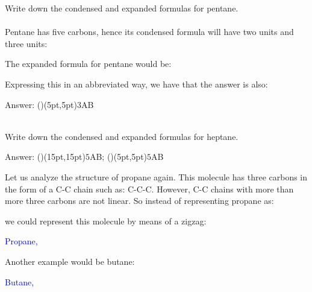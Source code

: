 \documentclass[main.tex]{subfiles}
\newcommand{\mytriangleright}[1]{\tikz{\filldraw[draw=#1,fill=#1] (0,0) --(0em,0.6em) -- (0.4em,0.3em);}}
\begin{document}
\begin{description}
\begin{example} %
Write down the condensed and expanded formulas for pentane.
\\
\\
Pentane has five carbons, hence its condensed formula will have two  units and three  units:
\begin{center}\end{center}
The expanded formula for pentane would be:
\begin{center} \end{center}
Expressing this in an abbreviated way, we have that the answer is also:
\begin{flushright}  \mytriangleright{dgreen} \small Answer:  \setpolymerdelim()\makebraces(5pt,5pt){$\scriptstyle\!\!3$}{A}{B} \end{flushright}
\faDiamond\ \\
Write down the condensed and expanded formulas for heptane.
 \begin{flushright} \mytriangleright{dgreen}\small Answer: \small 
 \setpolymerdelim()\makebraces(15pt,15pt){$\scriptstyle\!\!5$}{A}{B}; 
  \setpolymerdelim()\makebraces(5pt,5pt){$\scriptstyle\!\!5$}{A}{B}
 \end{flushright}

\end{example}%






\item[\docfilehook{  ZigZag}{ZigZag}] Let us analyze the structure of propane again. This molecule has three carbons in the form of a C-C chain such as: C-C-C. However, C-C chains with more than more three carbons are not linear. So instead of representing propane as:
\begin{center} \end{center}
we could represent this molecule by means of a zigzag:

\begin{center} \hspace{0.5cm}\textcolor{blue}{Propane, }\end{center}
Another example would be butane:
\begin{center} \hspace{0.5cm}\textcolor{blue}{Butane, }\end{center}


\end{description}
\end{document}
